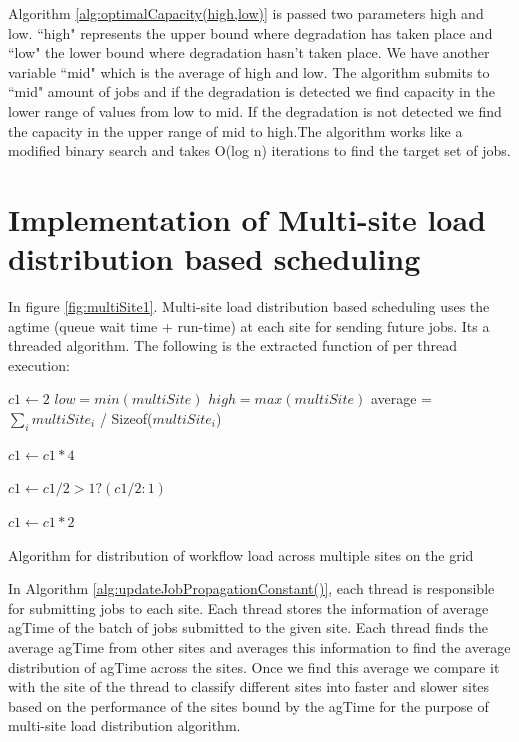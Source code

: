 \documentclass[ms,electronic,double]{nuthesis}
\begin{document}
Algorithm \ref{alg:optimalCapacity(high,low)} is passed two parameters high and 
low. ``high" represents the upper bound where degradation has taken place and ``low" the lower bound 
where degradation hasn't taken place. We have another variable ``mid" which is the average of high and low.
The algorithm submits to ``mid" amount of jobs and if the degradation is detected we find capacity in
the lower range of values from low to mid. If the degradation is not detected we find the capacity in 
the upper range of mid to high.The algorithm works like a modified binary 
search and takes O(log n) iterations to find the target set of jobs.

\section{Implementation of Multi-site load distribution based scheduling}
In figure \ref{fig:multiSite1}. Multi-site load distribution based scheduling uses the agtime (queue wait time + run-time) at each 
site for sending future jobs. Its a threaded algorithm. The following is the extracted function of per thread execution:

\begin{algorithm}
\begin{algorithmic}

\STATE $c1 \gets 2$ 
\STATE $low = min(multiSite)$
\STATE $high = max(multiSite)$
\STATE average = $\sum_i multiSite_i$ / Sizeof($multiSite_i$)

\STATE $c1 \gets c1 * 4$
\ENDIF

\STATE $c1 \gets c1/2>1 ? (c1/2:1)$
\ENDIF

\STATE $c1 \gets c1 * 2$
\ENDIF

\end{algorithmic}
\caption{Algorithm for distribution of workflow load across multiple sites on the grid}
\label{alg:updateJobPropagationConstant()}
\end{algorithm}

In Algorithm \ref{alg:updateJobPropagationConstant()}, each thread is responsible for submitting jobs 
to each site. Each thread stores the information of average agTime of the batch of jobs submitted to the given site.
 Each thread finds the average agTime from other sites and averages this 
 information to find the average distribution of agTime across the sites. Once 
 we find this average we compare it with the site of the thread to classify different sites 
into faster and slower sites based on the performance of the sites bound by the 
agTime for the purpose of multi-site load distribution algorithm.
\end{document}
